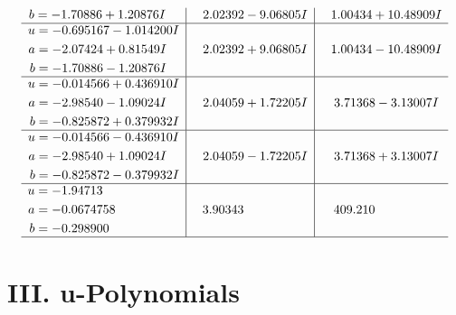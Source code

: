 \documentclass[1p]{elsarticle_modified}
\theoremstyle{definition}
\begin{document}
$$\begin{array}{c|c|c}
\begin{aligned}
b &= -1.70886 + 1.20876 I\end{aligned}
 & \phantom{-}2.02392 - 9.06805 I & \phantom{-}1.00434 + 10.48909 I \\ \hline\begin{aligned}
u &= -0.695167 - 1.014200 I \\
a &= -2.07424 + 0.81549 I \\
b &= -1.70886 - 1.20876 I\end{aligned}
 & \phantom{-}2.02392 + 9.06805 I & \phantom{-}1.00434 - 10.48909 I \\ \hline\begin{aligned}
u &= -0.014566 + 0.436910 I \\
a &= -2.98540 - 1.09024 I \\
b &= -0.825872 + 0.379932 I\end{aligned}
 & \phantom{-}2.04059 + 1.72205 I & \phantom{-}3.71368 - 3.13007 I \\ \hline\begin{aligned}
u &= -0.014566 - 0.436910 I \\
a &= -2.98540 + 1.09024 I \\
b &= -0.825872 - 0.379932 I\end{aligned}
 & \phantom{-}2.04059 - 1.72205 I & \phantom{-}3.71368 + 3.13007 I \\ \hline\begin{aligned}
u &= -1.94713\phantom{ +0.000000I} \\
a &= -0.0674758\phantom{ +0.000000I} \\
b &= -0.298900\phantom{ +0.000000I}\end{aligned}
 & \phantom{-}3.90343\phantom{ +0.000000I} & \phantom{-}409.210\phantom{ +0.000000I}\\
 \hline 
 \end{array}$$\newpage
\newpage\renewcommand{\arraystretch}{1}
\centering \section*{ III. u-Polynomials}
\end{document}
